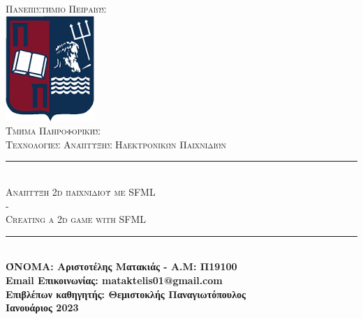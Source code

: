 \documentclass[12pt]{article}
\begin{document}
	
	\begin{titlepage}
		
		\newcommand{\HRule}{\rule{\linewidth}{0.5mm}} %
		
		\center %
		
		
		\textsc{\LARGE Πανεπιστήμιο Πειραιώς}\\[1.5cm] %
		\includegraphics[scale=0.6]{UNIPI_(logo).png}\\[1cm] %
		\textsc{\Large Τμήμα Πληροφορικής}\\[0.5cm] %
		\textsc{\large Τεχνολογίες Ανάπτυξης Ηλεκτρονικών Παιχνιδιών}\\[0.5cm] %
		
		
		\HRule \\[0.4cm]
		\textsc{\Large Ανάπτυξη 2d παιχνιδιού με SFML \\-\\ Creating a 2d game with SFML\\[0.4cm]} %
		\HRule \\[1.5cm]
		
		
		{  \bfseries ΌΝΟΜΑ: Αριστοτέλης Ματακιάς - Α.Μ: Π19100\\[0.4cm] Email Επικοινωνίας: mataktelis01@gmail.com\\[0.4cm] Επιβλέπων καθηγητής: Θεμιστοκλής Παναγιωτόπουλος\\[0.4cm] Ιανουάριος 2023}%
		

\end{titlepage}
\end{document}
